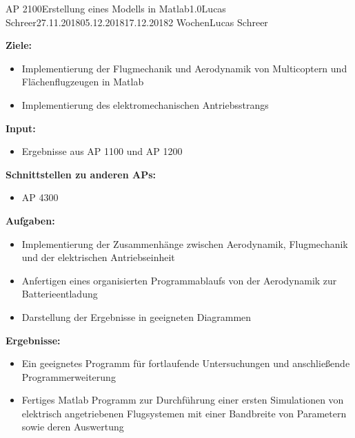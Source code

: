 \begin{appendix}
\clearpage
\begin{wpd}{AP 2100}{Erstellung eines Modells in Matlab}{1.0}{Lucas Schreer}{27.11.2018}{05.12.2018}{17.12.2018}{2 Wochen}{Lucas Schreer}
    {
    \textbf{Ziele:}
    \begin{itemize}
        \item Implementierung der Flugmechanik und Aerodynamik von Multicoptern und Flächenflugzeugen in Matlab
        \item Implementierung des elektromechanischen Antriebsstrangs
    \end{itemize}
    \textbf{Input:}
    \begin{itemize}
        \item Ergebnisse aus AP 1100 und AP 1200
    \end{itemize}
    \textbf{Schnittstellen zu anderen APs:}
    \begin{itemize}
        \item AP 4300
    \end{itemize}
    \textbf{Aufgaben:}
    \begin{itemize}
    	\item Implementierung der Zusammenhänge zwischen Aerodynamik, Flugmechanik und der elektrischen Antriebseinheit
    	\item Anfertigen eines organisierten Programmablaufs von der Aerodynamik zur Batterieentladung
    	\item Darstellung der Ergebnisse in geeigneten Diagrammen
    \end{itemize}
    \textbf{Ergebnisse:}
    \begin{itemize}
        \item Ein geeignetes Programm für fortlaufende Untersuchungen und anschließende Programmerweiterung
        \item Fertiges Matlab Programm zur Durchführung einer ersten Simulationen von elektrisch angetriebenen Flugsystemen mit einer Bandbreite von Parametern sowie deren Auswertung
    \end{itemize}
    }
\end{wpd}



\end{appendix}
